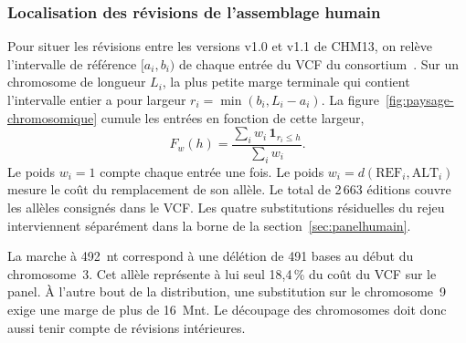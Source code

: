\subsubsection{Localisation des révisions de l’assemblage humain}\label{sec:paysage-chromosomique}
Pour situer les révisions entre les versions v1.0 et v1.1 de CHM13, on relève l’intervalle de référence \([a_i,b_i)\) de chaque entrée du VCF du consortium~\cite{chmreleases,mccartney}. Sur un chromosome de longueur \(L_i\), la plus petite marge terminale qui contient l’intervalle entier a pour largeur \(r_i=\min(b_i,L_i-a_i)\). La figure~\ref{fig:paysage-chromosomique} cumule les entrées en fonction de cette largeur,
\[
 F_w(h)=\frac{\sum_i w_i\,\mathbf{1}_{r_i\le h}}{\sum_i w_i}.
\]
Le poids \(w_i=1\) compte chaque entrée une fois. Le poids \(w_i=d(\mathrm{REF}_i,\mathrm{ALT}_i)\) mesure le coût du remplacement de son allèle. Le total de 2\,663 éditions couvre les allèles consignés dans le VCF. Les quatre substitutions résiduelles du rejeu interviennent séparément dans la borne de la section~\ref{sec:panelhumain}.

\FloatBarrier
{}
La marche à 492~nt correspond à une délétion de 491 bases au début du chromosome~3. Cet allèle représente à lui seul 18,4\,\% du coût du VCF sur le panel. À l’autre bout de la distribution, une substitution sur le chromosome~9 exige une marge de plus de 16~Mnt. Le découpage des chromosomes doit donc aussi tenir compte de révisions intérieures.

